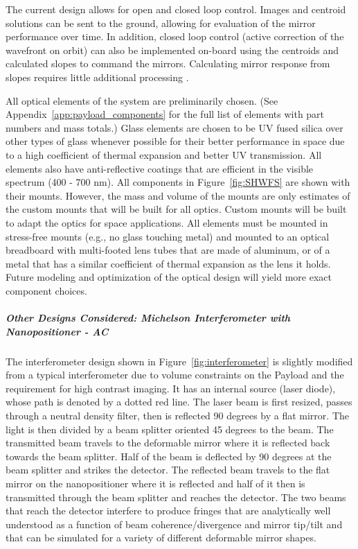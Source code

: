 \documentclass[12pt]{article}
\begin{document}
The current design allows for open and closed loop control.  Images and centroid solutions can be sent to the ground, allowing for evaluation of the mirror performance over time.  In addition, closed loop control (active correction of the wavefront on orbit) can also be implemented on-board using the centroids and calculated slopes to command the mirrors.  Calculating mirror response from slopes requires little additional processing \cite{centroids}. 

All optical elements of the system are preliminarily chosen.
(See Appendix~\ref{app:payload_components} for the full list of
elements with part numbers and mass totals.)  Glass elements are
chosen to be UV fused silica over other types of glass whenever possible for
their better performance in space \cite{radiation_optics} due to a
high coefficient of thermal expansion and better UV transmission.  All
elements also have anti-reflective coatings that are efficient in the
visible spectrum (400 - 700 nm).  All components in Figure~\ref{fig:SHWFS} are shown with their mounts.  However, the mass and volume of the mounts are only estimates of the custom mounts that will be built for all optics.  Custom mounts will be built to adapt the optics for space applications.  All elements must be mounted in stress-free mounts (e.g., no glass touching metal) and mounted to an optical breadboard with multi-footed lens tubes that are made of aluminum, or of a metal that has a similar coefficient of thermal expansion as the lens it holds.  Future modeling and optimization of the optical design will yield more exact component choices.

\subparagraph{Other Designs Considered: Michelson Interferometer with Nanopositioner - AC}\label{sec:payload_interferometer}
The interferometer design shown in Figure~\ref{fig:interferometer} is slightly modified from a typical interferometer due to volume constraints on the Payload and the requirement for high contrast imaging. It has an internal source (laser diode), whose path is denoted by a dotted red line.
The laser beam is first resized, passes through a neutral density filter, then is reflected 90 degrees by a
flat mirror. The light is then divided by a beam splitter oriented 45
degrees to the beam. The transmitted beam travels to the deformable
mirror where it is reflected back towards the beam splitter. Half of
the beam is deflected by 90 degrees at the beam splitter and strikes
the detector. The reflected beam travels to the flat mirror on the
nanopositioner where it is reflected and half of it then is transmitted
through the beam splitter and reaches the detector. The two beams that
reach the detector interfere to produce fringes \cite{traeger} that are analytically well understood as a function of beam coherence/divergence and mirror tip/tilt \cite{demtroeder} and that can be simulated for a variety of different deformable mirror shapes.
\end{document}
